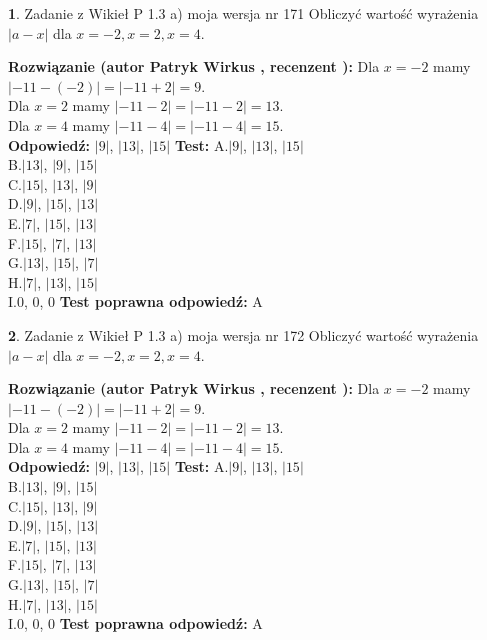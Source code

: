 \documentclass[12pt, a4paper]{article}
\theoremstyle{definition} %
\newtheorem{zad}{}
\newcommand{\zadStart}[1]{\begin{zad}#1\newline}
\newcommand{\zadStop}{\end{zad}}
\newcommand{\rozwStart}[2]{\noindent \textbf{Rozwiązanie (autor #1 , recenzent #2): }\newline}
\newcommand{\rozwStop}{\newline}
\newcommand{\odpStart}{\noindent \textbf{Odpowiedź:}\newline}
\newcommand{\odpStop}{\newline}
\newcommand{\testStart}{\noindent \textbf{Test:}\newline}
\newcommand{\testStop}{\newline}
\newcommand{\kluczStart}{\noindent \textbf{Test poprawna odpowiedź:}\newline}
\newcommand{\kluczStop}{\newline}
\begin{document}
\zadStart{Zadanie z Wikieł P 1.3 a) moja wersja nr 171}
Obliczyć wartość wyrażenia $|a - x|$ dla $x=-2,x=2,x=4$.
\zadStop
\rozwStart{Patryk Wirkus}{}
Dla $x = -2$ mamy $|-11 - (-2)| = |-11 + 2| = 9$.\\
Dla $x = 2$ mamy $|-11 - 2| = |-11 - 2| = 13$.\\
Dla $x = 4$ mamy $|-11 - 4| = |-11 - 4| = 15$.\\
\rozwStop
\odpStart
$|9|$, $|13|$, $|15|$
\odpStop
\testStart
A.$|9|$, $|13|$, $|15|$\\
B.$|13|$, $|9|$, $|15|$\\
C.$|15|$, $|13|$, $|9|$\\
D.$|9|$, $|15|$, $|13|$\\
E.$|7|$, $|15|$, $|13|$\\
F.$|15|$, $|7|$, $|13|$\\
G.$|13|$, $|15|$, $|7|$\\
H.$|7|$, $|13|$, $|15|$\\
I.$0$, $0$, $0$
\testStop
\kluczStart
A
\kluczStop



\zadStart{Zadanie z Wikieł P 1.3 a) moja wersja nr 172}
Obliczyć wartość wyrażenia $|a - x|$ dla $x=-2,x=2,x=4$.
\zadStop
\rozwStart{Patryk Wirkus}{}
Dla $x = -2$ mamy $|-11 - (-2)| = |-11 + 2| = 9$.\\
Dla $x = 2$ mamy $|-11 - 2| = |-11 - 2| = 13$.\\
Dla $x = 4$ mamy $|-11 - 4| = |-11 - 4| = 15$.\\
\rozwStop
\odpStart
$|9|$, $|13|$, $|15|$
\odpStop
\testStart
A.$|9|$, $|13|$, $|15|$\\
B.$|13|$, $|9|$, $|15|$\\
C.$|15|$, $|13|$, $|9|$\\
D.$|9|$, $|15|$, $|13|$\\
E.$|7|$, $|15|$, $|13|$\\
F.$|15|$, $|7|$, $|13|$\\
G.$|13|$, $|15|$, $|7|$\\
H.$|7|$, $|13|$, $|15|$\\
I.$0$, $0$, $0$
\testStop
\kluczStart
A
\kluczStop
\end{document}
